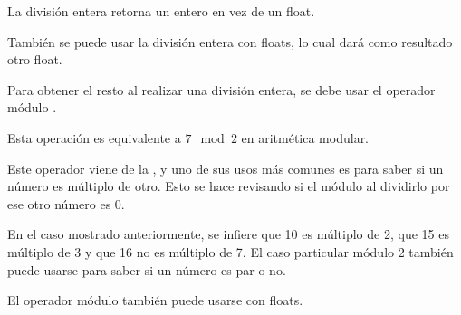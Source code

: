 La división entera retorna un entero en vez de un float.


También se puede usar la división entera con floats, lo cual dará como resultado otro float.


Para obtener el resto al realizar una división entera, se debe usar el operador módulo \ttt{\%}.


Esta operación es equivalente a $7 \mod{2}$ en aritmética modular.
\medskip

Este operador viene de la , y uno de sus usos más comunes es para saber si un número es múltiplo de otro.
Esto se hace revisando si el módulo al dividirlo por ese otro número es 0.


En el caso mostrado anteriormente, se infiere que 10 es múltiplo de 2, que 15 es múltiplo de 3 y que 16 no es múltiplo de 7.
El caso particular módulo 2 también puede usarse para saber si un número es par o no.
\medskip

El operador módulo \ttt{\%} también puede usarse con floats.


\clearpage